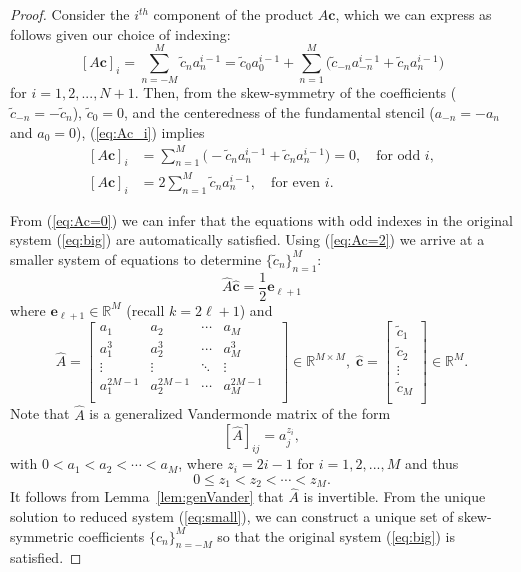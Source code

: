 \documentclass[10pt,a4paper]{amsart}
\begin{document}
\begin{proof}
Consider the $i^{th}$ component of the product $A\mathbf c$, which we can express as follows given our choice of indexing:
\begin{equation}\label{eq:Ac_i}
    [A\mathbf c]_i 
    = \sum_{n=-M}^M \tilde c_n a_n^{i-1}
    = \tilde c_0 a_0^{i-1} 
    + \sum_{n=1}^M \Big( \tilde c_{-n}a_{-n}^{i-1}+\tilde c_n a_{n}^{i-1}\Big)
\end{equation}
for $i=1,2,...,N+1$.
Then, from the skew-symmetry of the coefficients ($\tilde c_{-n}=-\tilde c_n$), $\tilde c_0 = 0$, and the centeredness of the fundamental stencil ($a_{-n}=-a_n$ and $a_0=0$), (\ref{eq:Ac_i}) implies 
\begin{subequations}
\begin{align}
	[A\mathbf c]_i 
	&= \sum_{n=1}^M \Big( -\tilde c_{n}a_{n}^{i-1}+\tilde c_n a_{n}^{i-1}\Big) = 0, \quad \text{for odd } i, \label{eq:Ac=0}\\
	[A\mathbf c]_i 
	&= 2\sum_{n=1}^M \tilde c_n a_{n}^{i-1}, \quad \text{for even } i. \label{eq:Ac=2}
\end{align}
\end{subequations}

From (\ref{eq:Ac=0}) we can infer that the equations with odd indexes in the original system (\ref{eq:big}) are automatically satisfied.
Using (\ref{eq:Ac=2}) we arrive at a smaller system of equations to determine $\{\tilde c_n\}_{n=1}^M$:
\begin{equation}\label{eq:small}
    \hat A \hat{\mathbf{c}}=\frac{1}{2}\mathbf e_{\ell+1}
\end{equation}
where $\mathbf e_{\ell+1}\in\mathbb R^{M}$ (recall $k=2\ell+1$) and
\[
    \hat A = 
    \begin{bmatrix} 
        a_1 & a_{2} & \cdots & a_{M} \\
        a_1^3 &a_2^3 & \cdots & a_M^3\\
        \vdots & \vdots &\ddots &\vdots & \\
        a_1^{2M-1} &a_2^{2M-1} & \cdots & a_M^{2M-1}\\  
    \end{bmatrix}\in\mathbb R^{M\times M}, \;
    \hat{\mathbf c} =
    \begin{bmatrix}
        \tilde c_1\\
        \tilde c_2\\
        \vdots\\
        \tilde c_M \\
    \end{bmatrix}\in\mathbb R^M.
\]
Note that $\hat A$ is a generalized Vandermonde matrix of the form
\[
	[\hat A]_{ij} = a_j^{z_i},
\]
with $0<a_1<a_2<\cdots < a_M$, where $z_i = 2i-1$ for $i=1,2,...,M$ and thus
\[
	0 \le z_1 < z_2 < \cdots < z_M.
\]
It follows from Lemma~\ref{lem:genVander} that $\hat A$ is invertible.
From the unique solution to reduced system (\ref{eq:small}), we can construct a unique set of skew-symmetric coefficients $\{c_n\}_{n=-M}^M$ so that the original system (\ref{eq:big}) is satisfied.


\end{proof}
\end{document}
